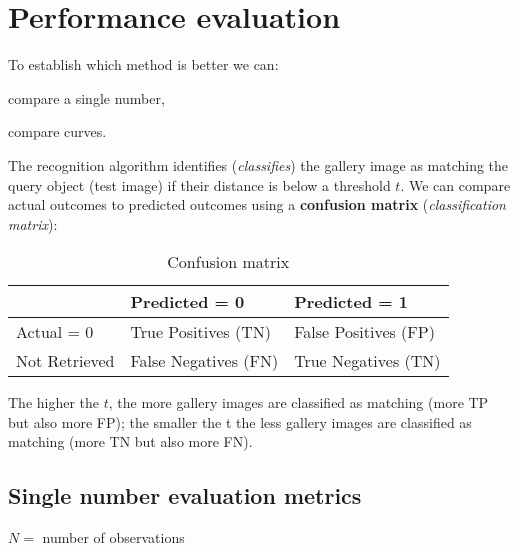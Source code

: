 \section{Performance evaluation}\label{sec:performance-evaluation}

To establish which method is better we can:
\begin{myitem}
    \item compare a single number,
    \item compare curves.
\end{myitem}

The recognition algorithm identifies (\textit{classifies}) the gallery image as matching the query object (test image) if their distance is below a threshold $t$. We can compare actual outcomes to predicted outcomes using a \textbf{confusion matrix} (\textit{classification matrix}):
\begin{table}[!h]
    \centering
    \begin{tabular}{l|l|l|}
        \cline{2-3}
        & Predicted = 0        & Predicted = 1    \\ \hline
        \multicolumn{1}{|l|}{Actual = 0}     & True Positives (TN)  & False Positives (FP) \\ \hline
        \multicolumn{1}{|l|}{Not Retrieved} & False Negatives (FN) & True Negatives (TN)  \\ \hline
    \end{tabular}
    \caption{Confusion matrix}
    \label{tab:confusion-matrix}
\end{table}

The higher the $t$, the more gallery images are classified as matching (more TP but also more FP); the smaller the t the less gallery images are classified as matching (more TN but also more FN).


\subsection{Single number evaluation metrics}\label{sec:pe-single}

$N = $ number of observations

